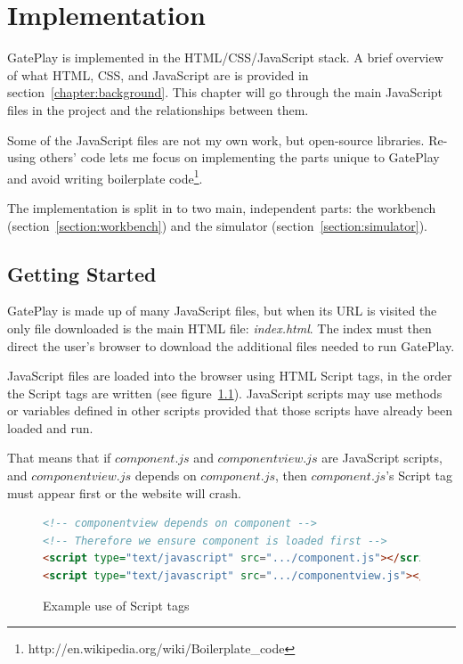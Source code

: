 \chapter{Implementation}
\label{chapter:implementation}

GatePlay is implemented in the HTML/CSS/JavaScript stack. A brief overview of what HTML, CSS, and JavaScript are is provided in section~\ref{chapter:background}. This chapter will go through the main JavaScript files in the project and the relationships between them.

Some of the JavaScript files are not my own work, but open-source libraries. Re-using others' code lets me focus on implementing the parts unique to GatePlay and avoid writing boilerplate code\footnote{http://en.wikipedia.org/wiki/Boilerplate\_code}.

The implementation is split in to two main, independent parts: the workbench (section~\ref{section:workbench}) and the simulator (section~\ref{section:simulator}).

\section{Getting Started}
GatePlay is made up of many JavaScript files, but when its URL is visited the only file downloaded is the main HTML file: \textit{index.html}. The index must then direct the user's browser to download the additional files needed to run GatePlay.

JavaScript files are loaded into the browser using HTML Script tags, in the order the Script tags are written (see figure~\ref{fig:scripttags}). JavaScript scripts may use methods or variables defined in other scripts provided that those scripts have already been loaded and run.

That means that if $component.js$ and $componentview.js$ are JavaScript scripts, and $componentview.js$ depends on $component.js$, then $component.js$'s Script tag must appear first or the website will crash.

\begin{figure}[H]
\begin{lstlisting}[language=html]
<!-- componentview depends on component -->
<!-- Therefore we ensure component is loaded first -->
<script type="text/javascript" src=".../component.js"></script>
<script type="text/javascript" src=".../componentview.js"></script>
\end{lstlisting}
\caption{Example use of Script tags}
\label{fig:scripttags}
\end{figure}


